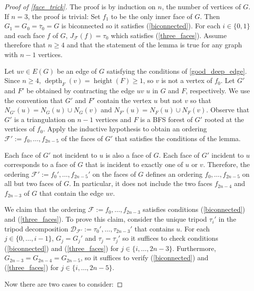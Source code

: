 \documentclass{patmorin}
\DeclareMathOperator{\height}{height}
\DeclareMathOperator{\depth}{depth}
\begin{document}
\begin{proof}[Proof of \cref{face_trick}]
  The proof is by induction on $n$, the number of vertices of $G$.  If $n=3$, the proof is trivial: Set $f_1$ to be the only inner face of $G$.  Then $G_1=G_0=\overline{\tau}_0=G$ is biconnected so it satisfies (\ref{biconnected}).  For each $i\in\{0,1\}$ and each face $f$ of $G$, $J_{\mathcal{F}}(f)=\tau_0$ which satisfies (\ref{three_faces}).  Assume therefore that $n\ge 4$ and that the statement of the lemma is true for any graph with $n-1$ vertices.

  Let $uv\in E(G)$ be an edge of $G$ satisfying the conditions of \cref{good_deep_edge}.  Since $n\ge 4$, $\depth_{F}(v)=\height(F)\ge 1$, so $v$ is not a vertex of $f_0$. Let $G'$ and $F'$ be obtained by contracting the edge $uv$ $u$ in $G$ and $F$, respectively. We use the convention that $G'$ and $F'$ contain the vertex $u$ but not $v$ so that $N_{G'}(u)=N_G(u)\cup N_G(v)$ and $N_{F'}(u)=N_F(u)\cup N_F(v)$.  Observe that $G'$ is a triangulation on $n-1$ vertices and $F$ is a BFS forest of $G'$ rooted at the vertices of $f_0$.   Apply the inductive hypothesis to obtain an ordering $\mathcal{F}':=f_0,\ldots,f_{2n-5}$ of the faces of $G'$ that satisfies the conditions of the lemma.

  Each face of $G'$ not incident to $u$ is also a face of $G$.  Each face of $G'$ incident to $u$ corresponds to a face of $G$ that is incident to exactly one of $u$ or $v$.
  Therefore, the ordering $\mathcal{F}':=f_0',\ldots,f_{2n-5}'$ on the faces of $G$ defines an ordering $f_0,\ldots,f_{2n-5}$ on all but two faces of $G$.  In particular, it does not include the two faces $f_{2n-4}$ and $f_{2n-3}$ of $G$ that contain the edge $uv$.  
  
  We claim that the ordering $\mathcal{F}:=f_0,\ldots,f_{2n-3}$ satisfies conditions (\ref{biconnected}) and (\ref{three_faces}). To prove this claim, consider the unique tripod $\tau_i'$ in the tripod decomposition $\mathcal{D}_{\mathcal{F'}}:=\tau_0',\ldots,\tau_{2n-3}'$ that contains $u$. For each $j\in\{0,\ldots,i-1\}$, $G_j=G_j'$ and $\tau_j=\tau_j'$ so it suffices to check conditions (\ref{biconnected}) and (\ref{three_faces}) for $j\in\{i,\ldots,2n-3\}$. Furthermore, $G_{2n-3}=G_{2n-4}=G_{2n-5}$, so it suffices to verify (\ref{biconnected}) and (\ref{three_faces}) for $j\in\{i,\ldots,2n-5\}$. 
  
  
  Now there are two cases to consider:


\end{proof}
\end{document}

